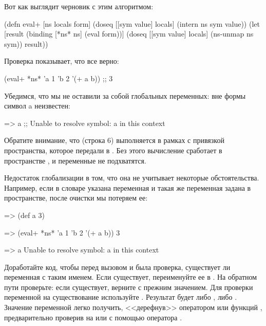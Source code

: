 Вот как выглядит черновик  с этим алгоритмом:

\begin{english}
  \begin{clojure}
(defn eval+ [ns locals form]
  (doseq [[sym value] locals]
    (intern ns sym value))
  (let [result
        (binding [*ns* ns]
          (eval form))]
    (doseq [[sym value] locals]
      (ns-unmap ns sym))
    result))
  \end{clojure}
\end{english}

Проверка показывает, что все верно:

\begin{english}
  \begin{clojure}
(eval+ *ns* {'a 1 'b 2} '(+ a b))
;; 3
  \end{clojure}
\end{english}

Убедимся, что мы не оставили за собой глобальных переменных: вне формы  символ a неизвестен:

\begin{english}
  \begin{text}
=> a
;; Unable to resolve symbol: a in this context
  \end{text}
\end{english}

Обратите внимание, что  (строка 6) выполняется в рамках  с привязкой пространства, которое передали в . Без этого вычисление сработает в пространстве , и переменные не подхватятся.

Недостаток глобализации в том, что она не учитывает некоторые обстоятельства. Например, если в словаре указана переменная  и такая же переменная задана в пространстве, после очистки мы потеряем ее:

\begin{english}
  \begin{clojure}
=> (def a 3)

=> (eval+ *ns* {'a 1 'b 2} '(+ a b))
3

=> a
Unable to resolve symbol: a in this context
  \end{clojure}
\end{english}

Доработайте код, чтобы перед вызовом  и  была проверка, существует ли переменная с таким именем. Если существует, переименуйте ее в . На обратном пути проверьте: если  существует, верните  с прежним значением. Для проверки переменной на существование используйте . Результат будет либо , либо . Значение переменной легко получить, <<дерефнув>>  оператором  или функций , предварительно проверив на  или с помощью оператора .


